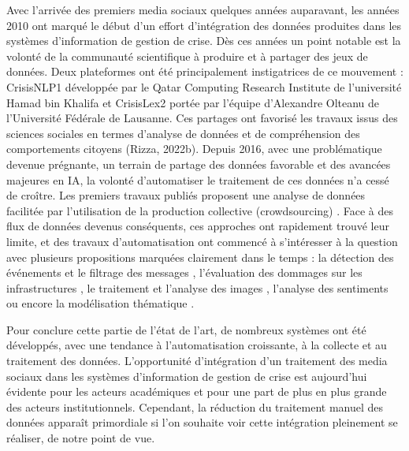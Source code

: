 Avec l'arrivée des premiers media sociaux quelques années auparavant, les années
2010 ont marqué le début d'un effort d'intégration des données produites dans les
systèmes d'information de gestion de crise. Dès ces années un point notable est la
volonté de la communauté scientifique à produire et à partager des jeux de données.
Deux plateformes ont été principalement instigatrices de ce mouvement : CrisisNLP1
développée par le Qatar Computing Research Institute de l'université Hamad bin
Khalifa et CrisisLex2 portée par l'équipe d'Alexandre Olteanu de l'Université Fédérale
de Lausanne. Ces partages ont favorisé les travaux issus des sciences sociales en
termes d'analyse de données et de compréhension des comportements citoyens
(Rizza, 2022b). Depuis 2016, avec une problématique devenue prégnante, un
terrain de partage des données favorable et des avancées majeures en IA, la volonté
d'automatiser le traitement de ces données n'a cessé de croître. Les premiers travaux
publiés proposent une analyse de données facilitée par l'utilisation de la production
collective (crowdsourcing) \parencite{backfriedOpenSourceIntelligence2012,imranCoordinatingHumanMachine2014,schulzCrisisInformationManagement2012}.
Face à des flux de données devenus conséquents, ces approches ont rapidement trouvé leur limite, et des travaux d'automatisation ont commencé à s'intéresser à la question avec plusieurs propositions marquées clairement dans le temps :
la détection des événements et le filtrage des messages \parencite{avvenutiEARSEarthquakeAlert2014,avvenutiPullingInformationSocial2016,fersiniEarthquakeManagementDecision2017,glasgowOurGriefUnspeakable2014},
l'évaluation des dommages sur les infrastructures \parencite{alamImage4ActOnlineSocial2017},
le traitement et l'analyse des images \parencite{nguyenAutomaticImageFiltering2017},
l'analyse des sentiments \parencite{halseSimulatingRealtimeTwitter2019,raginiBigDataAnalytics2018}
ou encore la modélisation thématique \parencite{grunder-fahrerTopicsTopicalPhases2018}.

Pour conclure cette partie de l'état de l'art, de nombreux systèmes ont été développés, avec une tendance à l'automatisation croissante, à la collecte et au traitement des données.
L'opportunité d'intégration d'un traitement des media sociaux dans les systèmes d'information de gestion de crise est aujourd'hui évidente pour les acteurs académiques et pour une part de plus en plus grande des acteurs institutionnels.
Cependant, la réduction du traitement manuel des données apparaît primordiale si l'on souhaite voir cette intégration pleinement se réaliser, de notre point de vue.

